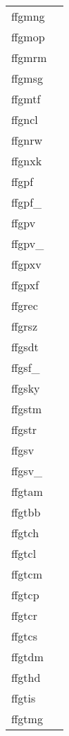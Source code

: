 \documentclass[11pt]{book}
\begin{document}
\begin{tabular}{lr}
ffgmng  & \pageref{ffgmng} \\
ffgmop    & \pageref{ffgmop} \\
ffgmrm   & \pageref{ffgmrm} \\
ffgmsg    & \pageref{ffgmsg} \\
ffgmtf  & \pageref{ffgmtf} \\
ffgncl     & \pageref{ffgnrw} \\
ffgnrw     & \pageref{ffgnrw} \\
ffgnxk      & \pageref{ffgnxk} \\
ffgpf & \pageref{ffgpf} \\
ffgpf\_ & \pageref{ffgpfx} \\
ffgpv         & \pageref{ffgpv} \\
ffgpv\_     & \pageref{ffgpvx} \\
ffgpxv   & \pageref{ffgpxv} \\
ffgpxf  & \pageref{ffgpxf} \\
ffgrec       & \pageref{ffgrec} \\
ffgrsz    & \pageref{ffgrsz} \\
ffgsdt        & \pageref{ffdt2s} \\
ffgsf\_ &  \pageref{ffgsfx} \pageref{ffgsfx2} \\
ffgsky  &  \pageref{ffgsky} \\
ffgstm        & \pageref{ffdt2s} \\
ffgstr         & \pageref{ffgcrd} \\
ffgsv  & \pageref{ffgsv} \\
ffgsv\_  & \pageref{ffgsvx} \pageref{ffgsvx2}\\
ffgtam & \pageref{ffgtam} \\
ffgtbb    & \pageref{ffgtbb} \\
ffgtch  & \pageref{ffgtch} \\
ffgtcl    & \pageref{ffgtcl} \\
ffgtcm & \pageref{ffgtcm} \\
ffgtcp  & \pageref{ffgtcp} \\
ffgtcr  & \pageref{ffgtcr} \\
ffgtcs & \pageref{ffgtcs} \\
ffgtdm         & \pageref{ffgtdm} \\
ffgthd & \pageref{ffgthd} \\
ffgtis  & \pageref{ffgtis} \\
ffgtmg  & \pageref{ffgtmg} \\

\end{tabular}
\end{document}
